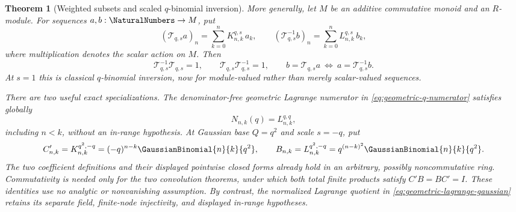 \documentclass[11pt,oneside]{article}
\newtheorem{theorem}{Theorem}[section]
\theoremstyle{definition}
\theoremstyle{remark}
\begin{document}
\begin{theorem}[Weighted subsets and scaled $q$-binomial inversion]
More generally, let \(M\) be an additive commutative monoid and an
\(R\)-module.  For sequences \(a,b:\NaturalNumbers\to M\), put
\begin{equation}
 (\mathcal T_{q,s}a)_n=\sum_{k=0}^{n}K^{q,s}_{n,k}\,a_k,
 \qquad
 (\mathcal T^{-1}_{q,s}b)_n=\sum_{k=0}^{n}L^{q,s}_{n,k}\,b_k,       \label{eq:q-scaled-module-transforms}
\end{equation}
where multiplication denotes the scalar action on \(M\).  Then
\begin{equation}
 \mathcal T^{-1}_{q,s}\mathcal T_{q,s}=1,
 \qquad \mathcal T_{q,s}\mathcal T^{-1}_{q,s}=1,
 \qquad
 b=\mathcal T_{q,s}a\ \Longleftrightarrow\
 a=\mathcal T^{-1}_{q,s}b.                              \label{eq:q-scaled-module-inversion}
\end{equation}
At \(s=1\) this is classical \(q\)-binomial inversion, now for
module-valued rather than merely scalar-valued sequences.

There are two useful exact specializations.  The denominator-free geometric
Lagrange numerator in \eqref{eq:geometric-q-numerator} satisfies globally
\begin{equation}
 N_{n,k}(q)=L^{q,q}_{n,k},                               \label{eq:q-geometric-numerator-kernel}
\end{equation}
including \(n<k\), without an in-range hypothesis.  At Gaussian base
\(Q=q^2\) and scale \(s=-q\), put
\begin{equation}
 C'_{n,k}=K^{q^2,-q}_{n,k}
   =(-q)^{n-k}\GaussianBinomial{n}{k}{q^2},
 \qquad
 B_{n,k}=L^{q^2,-q}_{n,k}
   =q^{(n-k)^2}\GaussianBinomial{n}{k}{q^2}.                        \label{eq:q-gaussian-inverse-kernels}
\end{equation}
The two coefficient definitions and their displayed pointwise closed forms
already hold in an arbitrary, possibly noncommutative ring.  Commutativity is
needed only for the two convolution theorems, under which both total finite
products satisfy \(C'B=BC'=I\).  These identities use no analytic or
nonvanishing assumption.  By contrast, the normalized Lagrange quotient in
\eqref{eq:geometric-lagrange-gaussian} retains its separate field,
finite-node injectivity, and displayed in-range hypotheses.
\end{theorem}
\end{document}
